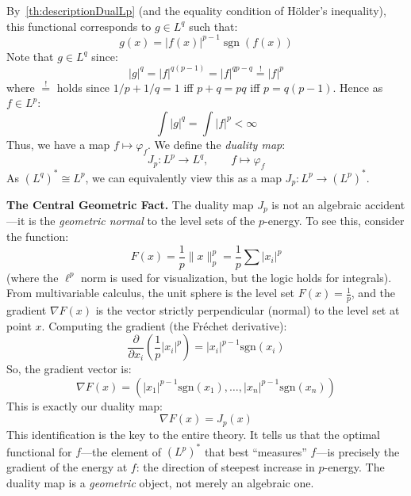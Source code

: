 \documentclass{article}
\newcommand{\sgn}{{\operatorname{sgn}}}
\let\temp\phi
\let\phi\varphi
\let\varphi\temp
\begin{document}
By~\cref{th:descriptionDualLp} (and the equality condition of H\"older's inequality), this functional
corresponds to $g \in L^q$ such that:
\[
	g(x) = |f(x)|^{p-1}\sgn(f(x))
\]
Note that $g \in L^q$ since:
\[
	|g|^q = |f|^{q(p-1)} = |f|^{qp - q} \overset{!}{=}|f|^p
\]
where $\overset{!}{=}$ holds since $1/p + 1/q = 1$ iff $p+q = pq$ iff $p = q(p-1)$. Hence as $f \in L^p$:
\[
	\int |g|^q = \int |f|^p < \infty
\]
Thus, we have a map $f \mapsto \phi_f$. We define the \emph{duality map}:
\[
	J_p: L^p \to L^q, \qquad f \mapsto \phi_f
\]
As $(L^q)^* \cong L^p$, we can equivalently view this as a map $J_p: L^p \to (L^p)^*$.

\medskip\noindent\textbf{The Central Geometric Fact.}\quad
The duality map $J_p$ is not an algebraic accident---it is the \emph{geometric normal} to the level sets of
the $p$-energy. To see this, consider the function:
\[
F(x) = \frac{1}{p} \|x\|_p^p = \frac{1}{p} \sum |x_i|^p
\]
(where the $\ell^p$ norm is used for visualization, but the logic holds for integrals).
From multivariable calculus, the unit sphere is the level set $F(x) = \frac{1}{p}$, and the gradient
$\nabla F(x)$ is the vector strictly perpendicular (normal) to the level set at point $x$.
Computing the gradient (the Fr\'echet derivative):
\[
\frac{\partial}{\partial x_i} \left( \frac{1}{p} |x_i|^p \right) = |x_i|^{p-1} \text{sgn}(x_i)
\]
So, the gradient vector is:
\[
\nabla F(x) = \left( |x_1|^{p-1}\text{sgn}(x_1), \dots, |x_n|^{p-1}\text{sgn}(x_n) \right)
\]
This is exactly our duality map:
\[
	\boxed{\nabla F(x) = J_p(x)}
\]
This identification is the key to the entire theory. It tells us that the optimal functional for
$f$---the element of $(L^p)^*$ that best ``measures'' $f$---is precisely the gradient of the energy at $f$:
the direction of steepest increase in $p$-energy. The duality map is a \emph{geometric} object, not merely an
algebraic one.
\end{document}
